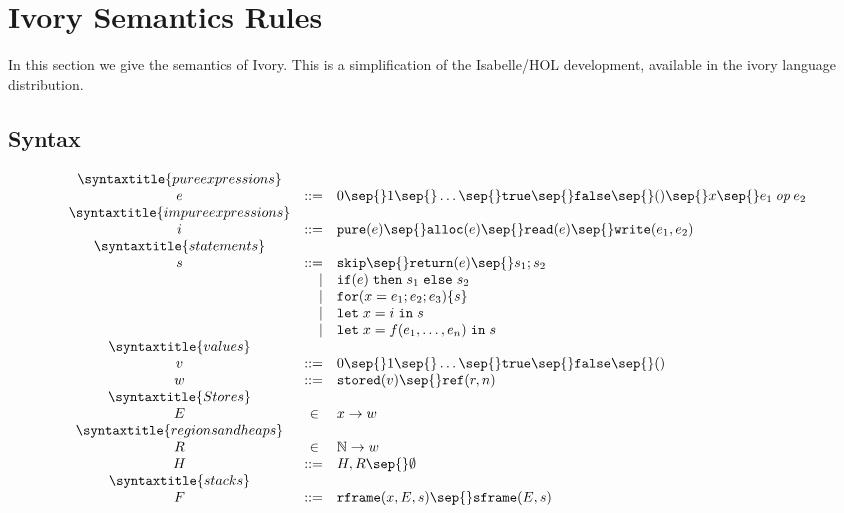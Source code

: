 
\section{Ivory Semantics Rules}
\label{sec:all-semantics}

In this section we give the semantics of Ivory.  This is a simplification of the Isabelle/HOL development, available in the
ivory language distribution.

\subsection{Syntax}

\[
\begin{array}{crl}
\syntaxtitle{pure expressions}\\
e & ::= & 0 \sep{} 1 \sep{} \ldots{} \sep{} \texttt{true} \sep{} \texttt{false} \sep{} () \sep{} x \sep{} 
          e_1 \mathbin{\mathit{op}} e_2 \\
\syntaxtitle{impure expressions}\\
i & ::= & \texttt{pure}(e) \sep{} \texttt{alloc}(e) \sep{}
          \texttt{read}(e) \sep{} \texttt{write}(e_1, e_2)\\
\syntaxtitle{statements}\\
s & ::= & \texttt{skip} \sep{} \texttt{return}(e) \sep{} s_1; s_2 \\ 
  & |   & \texttt{if}(e)\texttt{\;then\;} s_1 \texttt{\;else\;} s_2 \\
  & |   & \texttt{for}(x = e_1; e_2; e_3) \{ s \} \\
  & |   & \texttt{let\;} x = i \texttt{\;in\;} s \\
  & |   & \texttt{let\;} x = f(e_1, \ldots{}, e_n) \texttt{\;in\;} s \\
\syntaxtitle{values}\\
v & ::= & 0 \sep{} 1 \sep{} \ldots{} \sep{} \texttt{true} \sep{} \texttt{false} \sep{} () \\
w & ::= & \texttt{stored}(v) \sep{} \texttt{ref}(r, n) \\
\syntaxtitle{Stores}\\
E & \in{} & x \to w \\
\syntaxtitle{regions and heaps}\\
R & \in{} & \mathbb{N} \to w\\
H & ::=   & H, R \sep{} \emptyset{}\\
\syntaxtitle{stacks}\\
F & ::= & \texttt{rframe}(x, E, s) \sep{} \texttt{sframe}(E, s) \\

\end{array}\]
